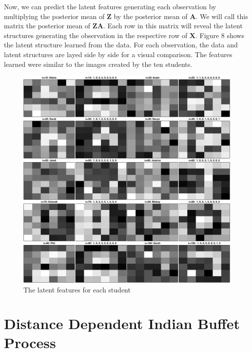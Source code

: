 \noindent
Now, we can predict the latent features generating each observation by
multiplying the posterior mean of $\bm Z$ by the posterior mean of $\bm A$. We
will call this matrix the posterior mean of $\bm {ZA}$. Each row in this matrix
will reveal the latent structures generating the observation in the respective
row of $\bm X$. Figure 8 shows the latent structure learned from the data. 
For each observation, the data and latent structures are layed side by side
for a visual comparison. The features learned were similar to the images
created by the ten students.


\begin{figure}\begin{center}
  \caption{The latent features for each student}
  \includegraphics[height=1\textwidth]{images/postFriends.pdf}
\end{center}\end{figure}


\section{Distance Dependent Indian Buffet Process}







